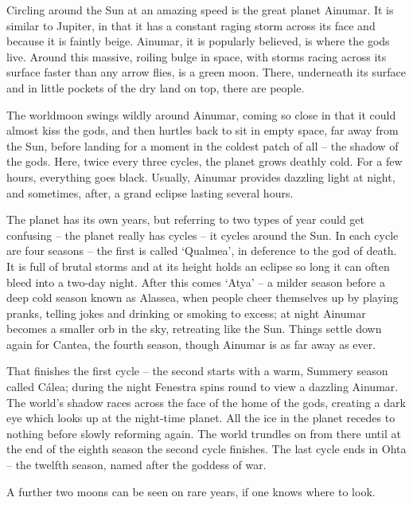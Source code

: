 \begin{multicols}{2}
\begin{tcolorbox}
\end{tcolorbox}

\noindent Circling around the Sun at an amazing speed is the great planet Ainumar.
It is similar to Jupiter, in that it has a constant raging storm across its face and because it is faintly beige.
Ainumar, it is popularly believed, is where the gods live.
Around this massive, roiling bulge in space, with storms racing across its surface faster than any arrow flies, is a green moon.
There, underneath its surface and in little pockets of the dry land on top, there are people.

The worldmoon swings wildly around Ainumar, coming so close in that it could almost kiss the gods, and then hurtles back to sit in empty space, far away from the Sun, before landing for a moment in the coldest patch of all -- the shadow of the gods.
Here, twice every three cycles, the planet grows deathly cold.
For a few hours, everything goes black.
Usually, Ainumar provides dazzling light at night, and sometimes, after, a grand eclipse lasting several hours.

The planet has its own years, but referring to two types of year could get confusing -- the planet really has cycles -- it cycles around the Sun.
In each cycle are four seasons -- the first is called `Qualmea', in deference to the god of death.
It is full of brutal storms and at its height holds an eclipse so long it can often bleed into a two-day night.
After this comes `Atya' -- a milder season before a deep cold season known as Alassea, when people cheer themselves up by playing pranks, telling jokes and drinking or smoking to excess; at night Ainumar becomes a smaller orb in the sky, retreating like the Sun.
Things settle down again for Cantea, the fourth season, though Ainumar is as far away as ever.

That finishes the first cycle -- the second starts with a warm, Summery season called C\'{a}lea; during the night Fenestra spins round to view a dazzling Ainumar.
The world's shadow races across the face of the home of the gods, creating a dark eye which looks up at the night-time planet.
All the ice in the planet recedes to nothing before slowly reforming again.
The world trundles on from there until at the end of the eighth season the second cycle finishes.
The last cycle ends in Ohta -- the twelfth season, named after the goddess of war.

A further two moons can be seen on rare years, if one knows where to look.

\end{multicols}

